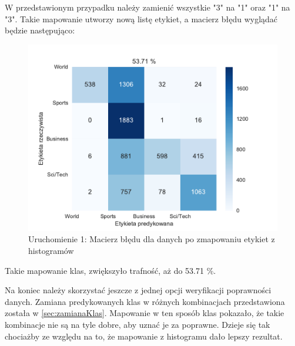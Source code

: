     W przedstawionym przypadku należy zamienić wszystkie "3" na "1" oraz "1" na "3". Takie mapowanie utworzy nową listę etykiet, a macierz błędu wyglądać będzie następująco:
    \newpage
    \begin{figure}[h!]
        \centering
        \includegraphics[scale=0.57]{Rysunki/Rozdzial3/run13.pdf}
        \caption{Uruchomienie 1: Macierz błędu dla danych po zmapowaniu etykiet z histogramów}
        \label{fig:r13}
    \end{figure}    
    
    Takie mapowanie klas, zwiększyło trafność, aż do 53.71 \%. 
    
    Na koniec należy skorzystać jeszcze z jednej opcji weryfikacji poprawności danych. Zamiana predykowanych klas w różnych kombinacjach przedstawiona została w \ref{sec:zamianaKlas}. Mapowanie w ten sposób klas pokazało, że takie kombinacje nie są na tyle dobre, aby uznać je za poprawne. Dzieje się tak chociażby ze względu na to, że mapowanie z histogramu dało lepszy rezultat.
    
